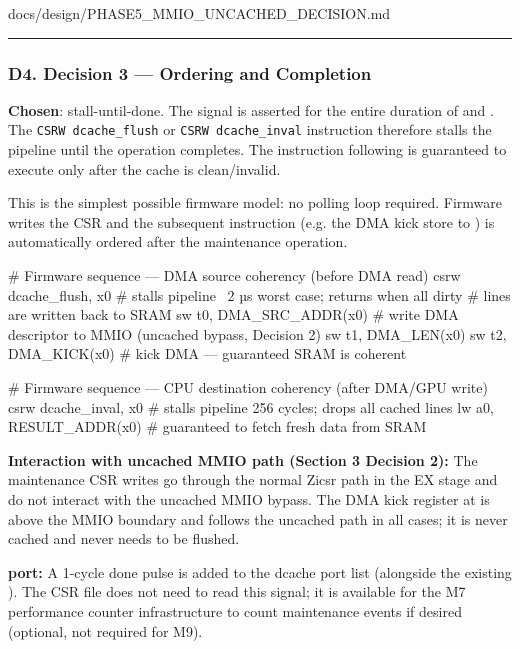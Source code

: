 \begin{relocated}{docs/design/PHASE5_MMIO_UNCACHED_DECISION.md}
\begin{center}\rule{0.5\linewidth}{0.5pt}\end{center}

\subsubsection{D4. Decision 3 --- Ordering and Completion}\label{ds:dec:phase5-mmio-uncached:d4-decision-3-ordering-and-completion}

\textbf{Chosen}: stall-until-done. The  signal is
asserted for the entire duration of  and
. The \texttt{CSRW\ dcache\_\allowbreak{}flush} or
\texttt{CSRW\ dcache\_\allowbreak{}inval} instruction therefore stalls
the pipeline until the operation completes. The instruction following
 is guaranteed to execute only after the cache is
clean/\allowbreak{}invalid.

This is the simplest possible firmware model: no polling loop required.
Firmware writes the CSR and the subsequent instruction (e.g. the DMA
kick store to ) is automatically ordered after the
maintenance operation.

\begin{textblock}
# Firmware sequence — DMA source coherency (before DMA read)
csrw  dcache_flush, x0    # stalls pipeline ~2 µs worst case; returns when all dirty
                           # lines are written back to SRAM
sw    t0, DMA_SRC_ADDR(x0) # write DMA descriptor to MMIO (uncached bypass, Decision 2)
sw    t1, DMA_LEN(x0)
sw    t2, DMA_KICK(x0)    # kick DMA — guaranteed SRAM is coherent

# Firmware sequence — CPU destination coherency (after DMA/GPU write)
csrw  dcache_inval, x0    # stalls pipeline 256 cycles; drops all cached lines
lw    a0, RESULT_ADDR(x0) # guaranteed to fetch fresh data from SRAM
\end{textblock}

\textbf{Interaction with uncached MMIO path (Section 3 Decision 2):} The
maintenance CSR writes go through the normal Zicsr path in the EX stage
and do not interact with the uncached MMIO bypass. The DMA kick register
at  is above the MMIO boundary and follows the
uncached path in all cases; it is never cached and never needs to be
flushed.

\textbf{ port:} A 1-cycle done pulse is added to
the dcache port list (alongside the existing ). The CSR
file does not need to read this signal; it is available for the M7
performance counter infrastructure to count maintenance events if
desired (optional, not required for M9).


\end{relocated}
